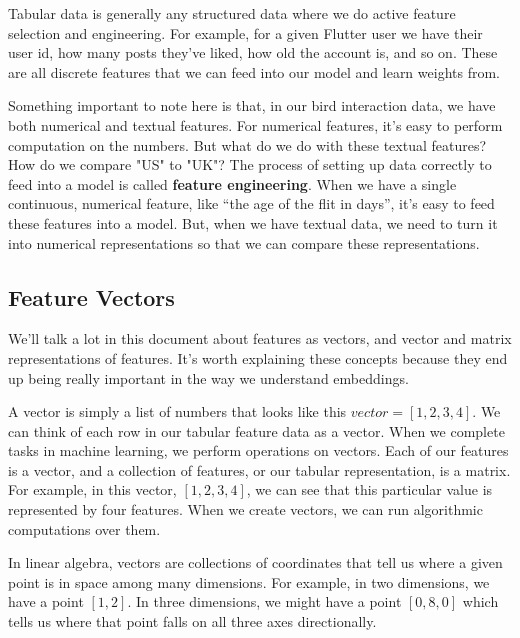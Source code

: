 \documentclass[draft, 11pt]{diazessay} %
\begin{document}
Tabular data is generally any structured data where we do active feature selection and engineering. For example, for a given Flutter user we have their user id, how many posts they've liked, how old the account is, and so on. These are all discrete features that we can feed into our model and learn weights from. 

Something important to note here is that, in our bird interaction data, we have both numerical and textual features. For numerical features, it's easy to perform computation on the numbers. But what do we do with these textual features? How do we compare "US" to "UK"? The process of setting up data correctly to feed into a model is called \textbf{feature engineering}. When we have a single continuous, numerical feature, like “the age of the flit in days”, it’s easy to feed these features into a model. But, when we have textual data, we need to turn it into numerical representations so that we can compare these representations.  

\subsection{Feature Vectors}
We'll talk a lot in this document about features as vectors, and vector and matrix representations of features. It's worth explaining these concepts because they end up being really important in the way we understand embeddings. 

A vector is simply a list of numbers that looks like this $vector = [1,2,3,4]$. We can think of each row in our tabular feature data as a vector.  When we complete tasks in machine learning, we perform operations on vectors. Each of our features is a vector, and a collection of features, or our tabular representation, is a matrix. For example, in this vector, $[1,2,3,4]$, we can see that this particular value is represented by four features. When we create vectors, we can run algorithmic computations over them. 

In linear algebra, vectors are collections of coordinates that tell us where a given point is in space among many dimensions. For example, in two dimensions, we have a point $[1,2]$. In three dimensions, we might have a point $[0,8,0]$ which tells us where that point falls on all three axes directionally. 
\end{document}
